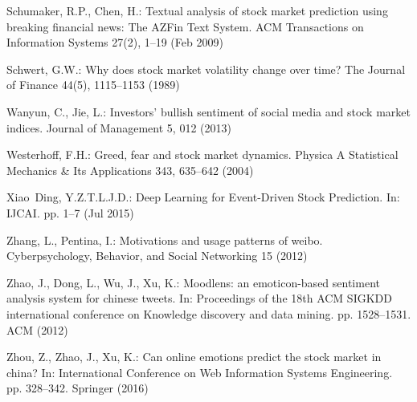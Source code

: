 \documentclass[aps,preprint,groupedaddress]{revtex4-1}
\begin{document}
\begin{thebibliography}{10}
Schumaker, R.P., Chen, H.: {Textual analysis of stock market prediction using
  breaking financial news: The AZFin Text System}. ACM Transactions on
  Information Systems  27(2),  1--19 (Feb 2009)

Schwert, G.W.: Why does stock market volatility change over time? The Journal
  of Finance  44(5),  1115--1153 (1989)

Wanyun, C., Jie, L.: Investors' bullish sentiment of social media and stock
  market indices. Journal of Management  5,  012 (2013)

Westerhoff, F.H.: Greed, fear and stock market dynamics. Physica A Statistical
  Mechanics \& Its Applications  343,  635--642 (2004)

Xiao~Ding, Y.Z.T.L.J.D.: {Deep Learning for Event-Driven Stock Prediction}. In:
  IJCAI. pp. 1--7 (Jul 2015)

{\color{black}{Young, P.: Jackknife and bootstrap resampling methods in statistical analysis
  to correct for bias. Statistical Science  11,  189--228 (1996)}}

Zhang, L., Pentina, I.: Motivations and usage patterns of weibo.
  Cyberpsychology, Behavior, and Social Networking  15 (2012)

Zhao, J., Dong, L., Wu, J., Xu, K.: Moodlens: an emoticon-based sentiment
  analysis system for chinese tweets. In: Proceedings of the 18th ACM SIGKDD
  international conference on Knowledge discovery and data mining. pp.
  1528--1531. ACM (2012)

Zhou, Z., Zhao, J., Xu, K.: Can online emotions predict the stock market in
  china? In: International Conference on Web Information Systems Engineering.
  pp. 328--342. Springer (2016)

\end{thebibliography}
\end{document}

